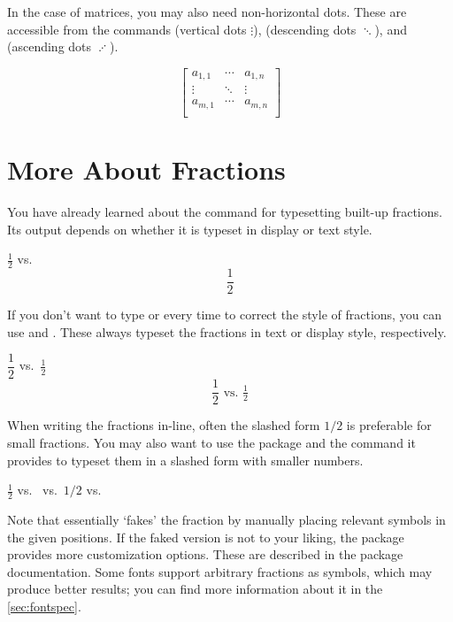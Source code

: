 In the case of matrices, you may also need non-horizontal dots. These are
accessible from the commands  (vertical dots \(\vdots\)), 
(descending dots \(\ddots\)), and  (ascending dots \(\adots\)).
\begin{example}
\[ \begin{bmatrix}
  a_{1,1} & \cdots  & a_{1,n} \\
  \vdots  & \ddots  & \vdots  \\
  a_{m,1} & \cdots  & a_{m,n} \\
\end{bmatrix} \]
\end{example}

\section{More About Fractions}\label{sec:fractions}

You have already learned about the  command for typesetting built-up
fractions. Its output depends on whether it is typeset in display or text
style.
\begin{example}
\( \frac{1}{2} \) vs.\
\[ \frac{1}{2} \]
\end{example}

If you don't want to type  or  every time to
correct the style of fractions, you can use \csi{tfrac} and \csi{dfrac}. These
always typeset the fractions in text or display style, respectively.
\begin{example}
\( \dfrac{1}{2} \) vs.\
\( \tfrac{1}{2} \)
\[ \dfrac{1}{2}\text{ vs.\ }
  \tfrac{1}{2} \]
\end{example}

When writing the fractions in-line, often the slashed form \(1/2\) is
preferable for small fractions. You may also want to use the 
package and the \csi{sfrac} command it provides to typeset them in a slashed
form with smaller numbers.
\begin{example}
\( \frac{1}{2} \) vs.\
 vs.\
\( 1/2 \) vs.\ \textonehalf{}
\end{example}
Note that \csi{sfrac} essentially \enquote*{fakes} the fraction by manually
placing relevant symbols in the given positions. If the faked version is not to
your liking, the package provides more customization options. These are
described in the package documentation. Some fonts support arbitrary fractions
as symbols, which may produce better results; you can find more information
about it in the \autoref{sec:fontspec}.

